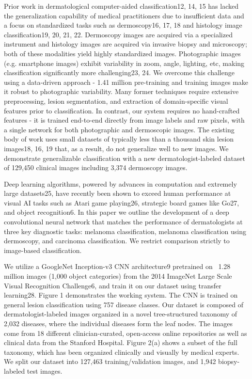 Prior work in dermatological computer-aided classification12, 14, 15 has lacked the generalization capability of medical practitioners due to insufficient data and a focus on standardized tasks such as dermoscopy16, 17, 18 and histology image classification19, 20, 21, 22. Dermoscopy images are acquired via a specialized instrument and histology images are acquired via invasive biopsy and microscopy; both of these modalities yield highly standardized images. Photographic images (e.g. smartphone images) exhibit variability in zoom, angle, lighting, etc, making classification significantly more challenging23, 24. We overcome this challenge using a data-driven approach - 1.41 million pre-training and training images make it robust to photographic variability. Many former techniques require extensive preprocessing, lesion segmentation, and extraction of domain-specific visual features prior to classification. In contrast, our system requires no hand-crafted features - it is trained end-to-end directly from image labels and raw pixels, with a single network for both photographic and dermoscopic images. The existing body of work uses small datasets of typically less than a thousand skin lesion images18, 16, 19 that, as a result, do not generalize well to new images. We demonstrate generalizable classification with a new dermatologist-labeled dataset of 129,450 clinical images including 3,374 dermoscopy images. 

Deep learning algorithms, powered by advances in computation and extremely large datasets25, have recently been shown to exceed human performance at visual AI tasks such as Atari game playing26, strategic board games like Go27, and object recognition6. In this paper we outline the development of a deep convolutional neural network that matches the performance of dermatologists at three key diagnostic tasks: melanoma classification, melanoma classification using dermoscopy, and carcinoma classification.  We restrict comparison strictly to image-based classification.

We utilize a GoogleNet Inception-v3 CNN architecture9 pretrained on ~1.28 million images (1,000 object categories) from the 2014 ImageNet Large Scale Visual Recognition Challenge6, and train it on our dataset using transfer learning28. Figure 1 demonstrates the working system. The CNN is trained on general lesion classification using 757 disease classes. Our dataset is composed of dermatologist-labeled images organized in a novel tree-structured taxonomy of 2,032 diseases, where the individual diseases form the leaf nodes. The images come from 18 different clinician-curated, open-access online repositories as well as clinical data from the Stanford Hospital. Figure 2(a) shows a subset of the full taxonomy, which has been organized clinically and visually by medical experts. We split our dataset into 127,463 training/validation images,  and 1,942 biopsy-labeled test images.


